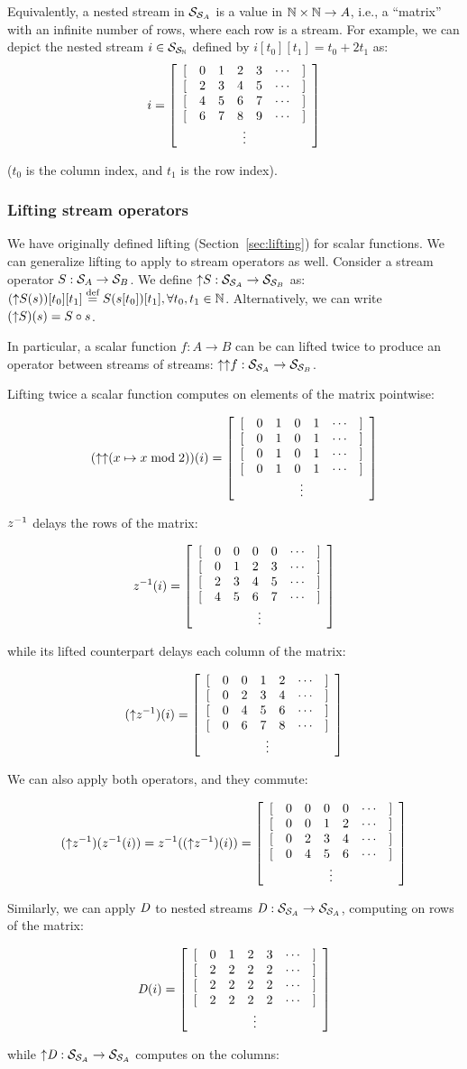 Equivalently, a nested stream in $\mathcal{S}_{\mathcal{S}_{A}}$ is a value in
$\mathbb{N} \times \mathbb{N} \to A$, i.e., a ``matrix''
with an infinite number of rows, where each row is a stream.  
For example, we can depict the nested stream 
$i \in \mathcal{S}_{\mathcal{S}_{\mathbb{N}}}$ defined by $i[t_0][t_1] = t_0 + 2 t_1$ as:
$$ i = \ssa{0 1 2 3 2 3 4 5 4 5 6 7 6 7 8 9} $$

\noindent ($t_0$ is the column index, and $t_1$ is the row index).

\subsubsection{Lifting stream operators}

We have originally defined lifting (Section~\ref{sec:lifting}) for scalar functions.
We can generalize lifting to apply to stream operators as well.  Consider a 
stream operator $S: \mathcal{S}_{A} \to \mathcal{S}_{B}$.  We define ${\uparrow}S: \mathcal{S}_{\mathcal{S}_{A}} 
\to \mathcal{S}_{\mathcal{S}_{B}}$ as: $({\uparrow}S(s))[t_0][t_1] \stackrel{\textrm{\scriptsize def}}{=} S(s[t_0])[t_1], \forall t_0, t_1 \in
\mathbb{N}$.  Alternatively, we can write $({\uparrow}S)(s) = S \circ s$.

In particular, a scalar function $f: A \rightarrow B$ can be can lifted twice to 
produce an operator between streams of streams: ${\uparrow}{\uparrow}f: \mathcal{S}_{\mathcal{S}_{A}} 
\rightarrow \mathcal{S}_{\mathcal{S}_{B}}$.

Lifting twice a scalar function computes on elements of the matrix pointwise:

$$(\lift{\lift{(x \mapsto x \bmod 2)}})(i) = 
  \ssa{0 1 0 1 0 1 0 1 0 1 0 1 0 1 0 1}
$$

$z^{-1}$ delays the rows of the matrix:

$$\zm(i) = \ssa{0 0 0 0 0 1 2 3 2 3 4 5 4 5 6 7}$$

\noindent while its lifted counterpart delays each column of the matrix:

$$(\lift{\zm})(i) = \ssa{0 0 1 2 0 2 3 4 0 4 5 6 0 6 7 8}$$

We can also apply both operators, and they commute:

$$(\lift{\zm})(\zm(i)) = \zm((\lift{\zm})(i)) = \ssa{0 0 0 0 0 0 1 2 0 2 3 4 0 4 5 6}$$

Similarly, we can apply $\mathit{D}$ to nested streams $\mathit{D} : \mathcal{S}_{\mathcal{S}_{A}} \to
\mathcal{S}_{\mathcal{S}_{A}}$, computing on rows of the matrix:

$$\D(i) = \ssa{0 1 2 3 2 2 2 2 2 2 2 2 2 2 2 2}$$

\noindent while ${\uparrow}\mathit{D} : \mathcal{S}_{\mathcal{S}_{A}} \to \mathcal{S}_{\mathcal{S}_{A}}$
computes on the columns:

